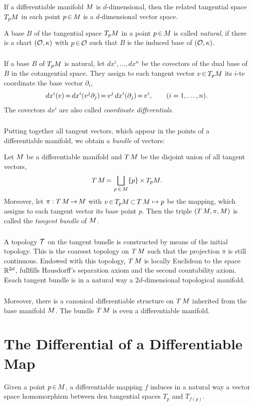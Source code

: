 \documentclass[11pt,twoside]{article}
\begin{document}
\subparagraph{}
If a differentiable manifold ${M}$ is $d$-dimensional,
then the related tangential space $T_p {M}$ in each point $p {\,\in\,} {M}$
is a $d$-dimensional vector space.

\begin{definition}
A base $B$ of the tangential space $T_p {M}$ in a point $p {\,\in\,} {M}$
is called \textit{natural},
if there is a chart $(\mathcal{O},\kappa)$ with $p {\,\in\,} \mathcal{O}$
such that
$B$ is the induced base of $(\mathcal{O},\kappa)$.
\end{definition}

\subparagraph{}
If a base $B$ of $T_p {M}$ is natural,
let $dx^i, \ldots, dx^n$ be the covectors of the dual base of $B$
in the cotangential space.
They assign to each tangent vector $v {\,\in\,} T_p {M}$ its $i$-te coordinate
{\wrt} the base vector $\partial_i$,
\[
dx^i(v) {\,=\,} dx^i(v^j \partial_j) {\,=\,} v^j \, dx^i(\partial_j) {\,=\,} v^i,
\qquad (i=1,\ldots,n).
\]
The covectors $dx^i$ are also called \textit{coordinate differentials}.

\subparagraph{}
Putting together all tangent vectors,
which appear in the points of a differentiable manifold,
we obtain a \textit{bundle} of vectors:

\begin{definition}
Let ${M}$ be a differentiable manifold
and $T\,{M}$ be the disjoint union of all tangent vectors,
\[
T\,{M} {\,=\,} \bigsqcup_{p {\,\in\,} {M}} \{p\} {\,\times\,} T_p {M}.
\]
Moreover, let
$\pi: T \, {M} {\,\to\,} {M}$ with $v {\,\in\,} T_p {M} {\,\subset\,} T \, {M} \mapsto p$
be the mapping,
which assigns to each tangent vector its base point $p$.
Then the triple $(T\,{M}, \pi, {M})$ is called
the \textit{tangent bundle} of ${M}$.
\end{definition}

\subparagraph{}
A topology $\mathcal{T}$ on the tangent bundle is constructed
by means of the initial topology.
This is the coarsest topology on $T\,{M}$
such that the projection $\pi$ is still continuous.
Endowed with this topology,
$T\,{M}$ is locally Euclidean to the space ${\mathbb{R}}^{2d}$,
fullfills {Hausdorff}'s separation axiom
and the second countability axiom.
Eeach tangent bundle is in a natural way
a $2d$-dimensional topological manifold.

\subparagraph{}
Moreover,
there is a canonical differentiable structure on $T\,{M}$
inherited from the base manifold ${M}$.
The bundle $T\,{M}$ is even a differentiable manifold.

\section{The Differential of a Differentiable Map}
Given a point $p {\,\in\,} {M}$,
a differentiable mapping $f$ induces
in a natural way a vector space homomorphism
between den tangential spaces $T_p$ and $T_{f(p)}$.
\end{document}
